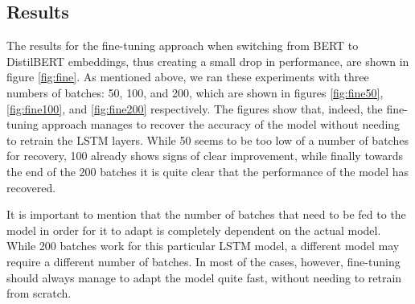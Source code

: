 \documentclass[12pt]{extreport}
\begin{document}
\subsection{Results}

The results for the fine-tuning approach when switching from BERT to DistilBERT embeddings, thus creating a small drop in performance, are shown in figure \ref{fig:fine}. As mentioned above, we ran these experiments with three numbers of batches: 50, 100, and 200, which are shown in figures \ref{fig:fine50}, \ref{fig:fine100}, and \ref{fig:fine200} respectively. The figures show that, indeed, the fine-tuning approach manages to recover the accuracy of the model without needing to retrain the LSTM layers. While 50 seems to be too low of a number of batches for recovery, 100 already shows signs of clear improvement, while finally towards the end of the 200 batches it is quite clear that the performance of the model has recovered.

It is important to mention that the number of batches that need to be fed to the model in order for it to adapt is completely dependent on the actual model. While 200 batches work for this particular LSTM model, a different model may require a different number of batches. In most of the cases, however, fine-tuning should always manage to adapt the model quite fast, without needing to retrain from scratch.
\end{document}
